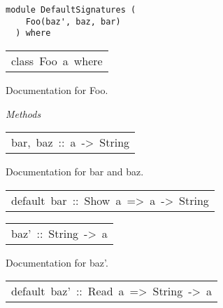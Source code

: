\label{module:DefaultSignatures}
\haddockbeginheader
{\haddockverb\begin{verbatim}
module DefaultSignatures (
    Foo(baz', baz, bar)
  ) where\end{verbatim}}
\haddockendheader

\begin{haddockdesc}
\item[\begin{tabular}{@{}l}
class\ Foo\ a\ where
\end{tabular}]\haddockbegindoc
Documentation for Foo.\par

\haddockpremethods{}\emph{Methods}
\begin{haddockdesc}
\item[\begin{tabular}{@{}l}
bar,\ baz\ ::\ a\ ->\ String
\end{tabular}]\haddockbegindoc
Documentation for bar and baz.\par

\end{haddockdesc}
\begin{haddockdesc}
\item[\begin{tabular}{@{}l}
default\ bar\ ::\ Show\ a\ =>\ a\ ->\ String
\end{tabular}]
\end{haddockdesc}
\begin{haddockdesc}
\item[\begin{tabular}{@{}l}
baz'\ ::\ String\ ->\ a
\end{tabular}]\haddockbegindoc
Documentation for baz'.\par

\end{haddockdesc}
\begin{haddockdesc}
\item[\begin{tabular}{@{}l}
default\ baz'\ ::\ Read\ a\ =>\ String\ ->\ a
\end{tabular}]
\end{haddockdesc}
\end{haddockdesc}